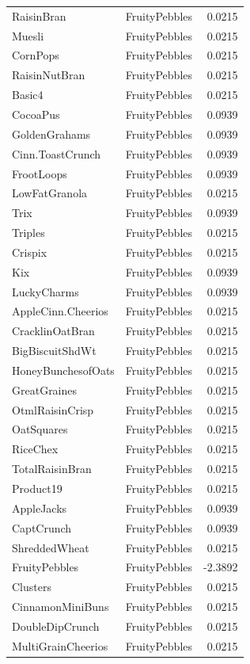 \begin{longtable}{llr}
RaisinBran & FruityPebbles & 0.0215 \\
Muesli & FruityPebbles & 0.0215 \\
CornPops & FruityPebbles & 0.0215 \\
RaisinNutBran & FruityPebbles & 0.0215 \\
Basic4 & FruityPebbles & 0.0215 \\
CocoaPus & FruityPebbles & 0.0939 \\
GoldenGrahams & FruityPebbles & 0.0939 \\
Cinn.ToastCrunch & FruityPebbles & 0.0939 \\
FrootLoops & FruityPebbles & 0.0939 \\
LowFatGranola & FruityPebbles & 0.0215 \\
Trix & FruityPebbles & 0.0939 \\
Triples & FruityPebbles & 0.0215 \\
Crispix & FruityPebbles & 0.0215 \\
Kix & FruityPebbles & 0.0939 \\
LuckyCharms & FruityPebbles & 0.0939 \\
AppleCinn.Cheerios & FruityPebbles & 0.0215 \\
CracklinOatBran & FruityPebbles & 0.0215 \\
BigBiscuitShdWt & FruityPebbles & 0.0215 \\
HoneyBunchesofOats & FruityPebbles & 0.0215 \\
GreatGraines & FruityPebbles & 0.0215 \\
OtmlRaisinCrisp & FruityPebbles & 0.0215 \\
OatSquares & FruityPebbles & 0.0215 \\
RiceChex & FruityPebbles & 0.0215 \\
TotalRaisinBran & FruityPebbles & 0.0215 \\
Product19 & FruityPebbles & 0.0215 \\
AppleJacks & FruityPebbles & 0.0939 \\
CaptCrunch & FruityPebbles & 0.0939 \\
ShreddedWheat & FruityPebbles & 0.0215 \\
FruityPebbles & FruityPebbles & -2.3892 \\
Clusters & FruityPebbles & 0.0215 \\
CinnamonMiniBuns & FruityPebbles & 0.0215 \\
DoubleDipCrunch & FruityPebbles & 0.0215 \\
MultiGrainCheerios & FruityPebbles & 0.0215 \\

\end{longtable}
